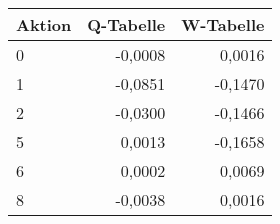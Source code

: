 \begin{tabular}{lrr}
\toprule
Aktion  & Q-Tabelle& W-Tabelle\\ \midrule
0   	& -0,0008	        & 0,0016  \\
1	    & -0,0851	        & -0,1470 \\
2	    & -0,0300       	& -0,1466 \\
5	    & 0,0013	        & -0,1658 \\
6	    & 0,0002        	& 0,0069  \\
8	    & -0,0038	        & 0,0016  \\ \bottomrule
\end{tabular}

